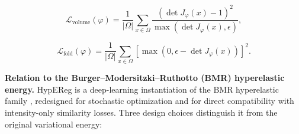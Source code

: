 \documentclass[jimaging,article,submit,pdftex,moreauthors]{Definitions/mdpi}
\begin{document}
\begin{linenomath}
\begin{equation}
\mathcal{L}_{\mathrm{volume}}(\varphi)=\frac{1}{|\Omega|}\sum_{x\in\Omega}\frac{(\det J_{\varphi}(x)-1)^2}{\max(\det J_{\varphi}(x),\epsilon)},
\end{equation}
\end{linenomath}
\begin{linenomath}
\begin{equation}
\mathcal{L}_{\mathrm{fold}}(\varphi)=\frac{1}{|\Omega|}\sum_{x\in\Omega}\left[\max(0,\epsilon-\det J_{\varphi}(x))\right]^2.
\end{equation}
\end{linenomath}
\noindent\textbf{Relation to the Burger--Modersitzki--Ruthotto (BMR) hyperelastic energy.}
HypEReg is a deep-learning instantiation of the BMR hyperelastic family \cite{burger2013hyperelastic}, redesigned for stochastic optimization and for direct compatibility with intensity-only similarity losses. Three design choices distinguish it from the original variational energy:
\end{document}
